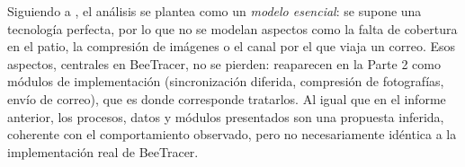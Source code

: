 Siguiendo a \textcite{yourdon1989}, el análisis se plantea como un \emph{modelo esencial}: se
supone una tecnología perfecta, por lo que no se modelan aspectos como la falta de cobertura
en el patio, la compresión de imágenes o el canal por el que viaja un correo. Esos aspectos,
centrales en BeeTracer, no se pierden: reaparecen en la Parte 2 como módulos de
implementación (sincronización diferida, compresión de fotografías, envío de correo), que es
donde corresponde tratarlos. Al igual que en el informe anterior, los procesos, datos y
módulos presentados son una propuesta inferida, coherente con el comportamiento observado,
pero no necesariamente idéntica a la implementación real de BeeTracer.
